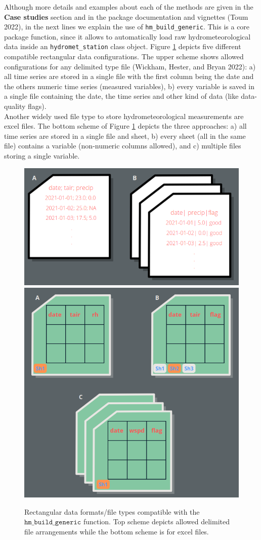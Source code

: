 Although more details and examples about each of the methods are given
in the \textbf{Case studies} section and in the package documentation and
vignettes (Toum 2022), in the next lines we explain the use of \texttt{hm\_build\_generic}.
This is a core package function, since it allows to automatically
load raw hydrometeorological data inside an \texttt{hydromet\_station} class
object. Figure \ref{fig:read-like} depicts five different
compatible rectangular data configurations. The upper scheme shows
allowed configurations for any delimited type file (Wickham, Hester, and Bryan 2022): a)
all time series are stored in a single file with the first column being
the date and the others numeric time series (measured variables),
b) every variable is saved in a single file containing the date,
the time series and other kind of data (like data-quality flags).\\
Another widely used file type to store hydrometeorological measurements are
excel files. The bottom scheme of Figure \ref{fig:read-like} depicts the
three approaches: a) all time series are stored in a single file
and sheet, b) every sheet (all in the same file) contains a
variable (non-numeric columns allowed), and c) multiple files storing a
single variable.

\begin{figure}

{\centering \includegraphics[width=0.52\linewidth]{./readr_like} \includegraphics[width=0.52\linewidth]{./readxl_like} 

}

\caption{Rectangular data formats/file types compatible with the $\texttt{hm\_build\_generic}$ function. Top scheme depicts allowed delimited file arrangements while the bottom scheme is for excel files.}\label{fig:read-like}
\end{figure}


